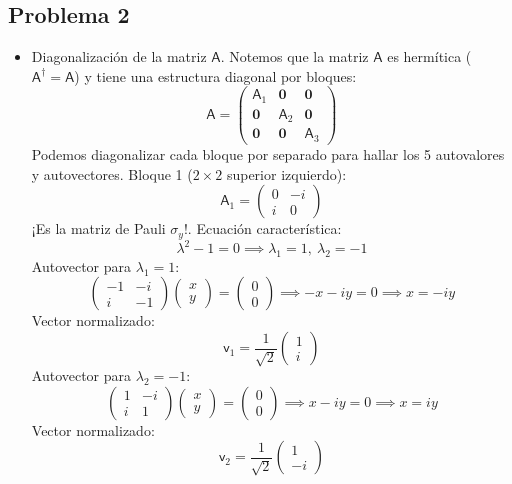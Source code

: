 \documentclass[11pt,spanish]{article}
\newcommand{\mat}[1]{\mathsf{#1}}
\begin{document}
\subsection*{Problema 2}
\begin{itemize}
\item Diagonalización de la matriz $\mat{A}$.
Notemos que la matriz $\mat{A}$ es hermítica ($\mat{A}^\dagger = \mat{A}$) y tiene una estructura diagonal por bloques:
$$
\mat{A} = \begin{pmatrix} \mat{A}_1 & \mathbf{0} & \mathbf{0} \\ \mathbf{0} & \mat{A}_2 & \mathbf{0} \\ \mathbf{0} & \mathbf{0} & \mat{A}_3 \end{pmatrix}
$$
Podemos diagonalizar cada bloque por separado para hallar los 5 autovalores y autovectores.
Bloque 1 ($2\times 2$ superior izquierdo): 
$$
\mat{A}_1 = \begin{pmatrix} 0 & -i \\ i & 0 \end{pmatrix}
$$
¡Es la matriz de Pauli $\sigma_y$!.
Ecuación característica: 
$$
\lambda^2 - 1 = 0 \implies \lambda_1 = 1, \ \lambda_2 = -1
$$
Autovector para $\lambda_1 = 1$: 
$$
\begin{pmatrix} -1 & -i \\ i & -1 \end{pmatrix} \begin{pmatrix} x \\ y \end{pmatrix} = \begin{pmatrix} 0 \\ 0 \end{pmatrix} \implies -x - iy = 0 \implies x = -iy
$$
Vector normalizado: 
$$
\mat{v}_1 = \frac{1}{\sqrt{2}} \begin{pmatrix} 1 \\ i \end{pmatrix}
$$
Autovector para $\lambda_2 = -1$: 
$$
\begin{pmatrix} 1 & -i \\ i & 1 \end{pmatrix} \begin{pmatrix} x \\ y \end{pmatrix} = \begin{pmatrix} 0 \\ 0 \end{pmatrix} \implies x - iy = 0 \implies x = iy
$$
Vector normalizado: 
$$
\mat{v}_2 = \frac{1}{\sqrt{2}} \begin{pmatrix} 1 \\ -i \end{pmatrix}
$$
\end{itemize}
\end{document}
